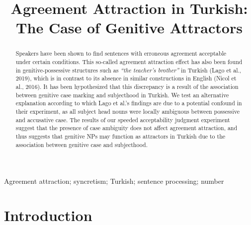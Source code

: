 \documentclass[]{interact}\usepackage[]{graphicx}\usepackage[]{color}
\theoremstyle{plain}%
\theoremstyle{definition}
\theoremstyle{remark}
\newcommand{\rev}[1]{{\color{red}#1}}
\begin{document}

\title{Agreement Attraction in Turkish: The Case of Genitive Attractors}

\author{
}

\maketitle

\begin{abstract}
Speakers have been shown to find sentences with erroneous agreement acceptable under certain conditions. This so-called agreement attraction effect has also been found in genitive-possessive structures such as \textit{``the teacher's brother''} in Turkish (Lago et al., 2019), which is in contrast to its absence in similar constructions in English (Nicol et al., 2016). It has been hypothesized that this discrepancy is a result of the association between genitive case marking and subjecthood in Turkish. We test an alternative explanation according to which Lago et al.'s findings are due to a potential confound in their experiment, as all subject head nouns were locally ambiguous between possessive and accusative case. The results of our speeded acceptability judgment experiment suggest that the presence of case ambiguity does not affect agreement attraction, and thus suggests that genitive NPs may function as attractors in Turkish due to the association between genitive case and subjecthood.



\end{abstract}

\begin{keywords}
Agreement attraction; syncretism; Turkish; \rev{sentence processing; number}
\end{keywords}


\section{Introduction}
\end{document}
